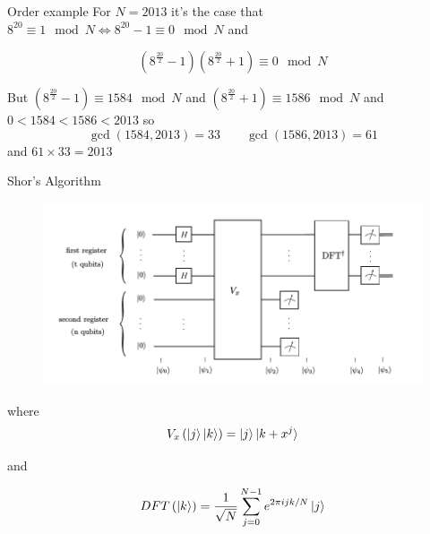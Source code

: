 \documentclass{beamer}
\begin{document}
\begin{frame}{Order example}
For $N=2013$ it's the case that $8^{20}\equiv 1 \mod N \iff 8^{20}- 1 \equiv 0 \mod N$ and 

\[
\left(8^{\frac{20}{2}}-1\right)\left(8^{\frac{20}{2}}+1\right)\equiv 0 \mod N
\]

But $\left(8^{\frac{20}{2}}-1\right)\equiv 1584 \mod N$ and  $\left(8^{\frac{20}{2}}+1\right)\equiv 1586 \mod N$ and $0<1584<1586<2013$ so 
\[
\gcd \left(1584,2013\right)=33 \qquad \gcd \left(1586,2013\right)=61
\]
 and $61\times 33=2013$

\end{frame}

\begin{frame}{Shor's Algorithm}

\begin{figure}[ht]
  \includegraphics[scale=0.4]{pasted5}
\end{figure}

where 
\[
V_x \left(\ket{j}\ket{k}\right) = \ket{j}\ket{k+x^j}
\]

and

\[
DFT\left(\ket{k}\right) = \frac{1}{\sqrt{N}}\sum_{j=0}^{N-1}e^{2\pi i j k/N}\ket{j}
\]
\end{frame}
\end{document}
